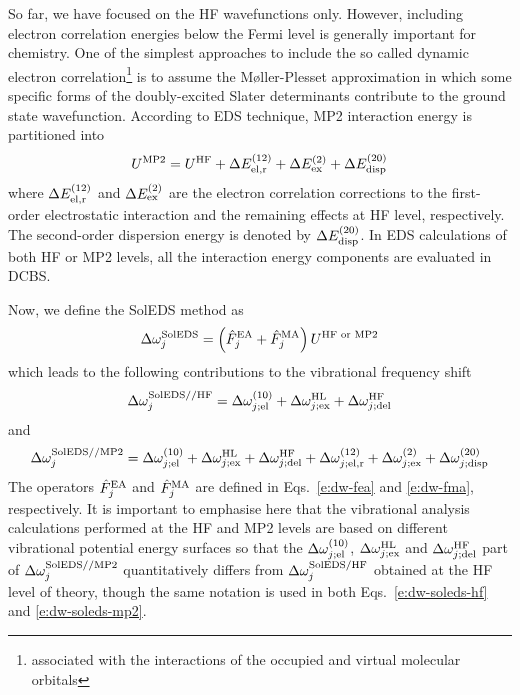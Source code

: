 \documentclass[a4paper,titlepage,twoside,fleqn,12pt]{book}
\begin{document}
\begin{refsection}
So far, we have focused on the HF wavefunctions only. \citep{Roothaan.RevModPhys.1951} 
However, including
electron correlation energies below the Fermi level is generally important
for chemistry. One of the simplest approaches to include the 
so called dynamic electron correlation\footnote{associated with
the interactions of the occupied and virtual molecular orbitals}
is to assume the 
M{\o}ller\hyp{}Plesset approximation \citep{Moller.Plesset.PhysRev.1934}
in which some specific forms of the doubly\hyp{}excited Slater
determinants contribute to the ground state wavefunction.
According to EDS technique, MP2 interaction energy is
partitioned into
%
\begin{equation}
 U^{\rm MP2} = U^{\rm HF}                    + 
               \Delta E_{\rm el,r}^{(12)}    + 
               \Delta E_{\rm ex}^{(2)}       +
               \Delta E_{\rm disp}^{(20)}  
\end{equation}
%
where $\Delta E_{\rm el,r}^{(12)}$ and $\Delta E_{\rm ex}^{(2)}$
are the electron correlation corrections to the first\hyp{}order
electrostatic interaction and the remaining effects at HF level,
respectively. The second\hyp{}order dispersion energy
is denoted by $\Delta E_{\rm disp}^{(20)}$. In EDS calculations
of both HF or MP2 levels,
all the interaction energy components are evaluated in DCBS.

Now, we define the SolEDS method as
%
\begin{equation} \label{e:dw-soleds}
 \Delta\omega_j^{\rm SolEDS} = \left(\hat{F}_j^{\rm EA} + \hat{F}_j^{\rm MA}\right)  U^{\rm HF\text{ or }MP2} 
\end{equation}
%
which leads to the following contributions to the vibrational
frequency shift
%
\begin{equation} \label{e:dw-soleds-hf}
 \Delta\omega_j^{\rm SolEDS//HF} = 
              \Delta \omega_{j;{\rm el}}^{(10)}    + 
              \Delta \omega_{j;{\rm ex}}^{\rm HL}  +
              \Delta \omega_{j;{\rm del}}^{\rm HF}
\end{equation}
%
and
%
\begin{equation} \label{e:dw-soleds-mp2}
 \Delta\omega_j^{\rm SolEDS//MP2} = 
              \Delta \omega_{j;{\rm el}}^{(10)}    + 
              \Delta \omega_{j;{\rm ex}}^{\rm HL}  +
              \Delta \omega_{j;{\rm del}}^{\rm HF} +
               \Delta \omega_{j;{\rm el,r}}^{(12)}    + 
               \Delta \omega_{j;{\rm ex}}^{(2)}       +
               \Delta \omega_{j;{\rm disp}}^{(20)}  
\end{equation}
%
The operators $\hat{F}_j^{\rm EA}$ and $\hat{F}_j^{\rm MA}$
are defined in Eqs.~\eqref{e:dw-fea} and \eqref{e:dw-fma}, respectively.
It is important to emphasise here that the vibrational analysis 
calculations performed at the HF and MP2 levels are based on different
vibrational potential energy surfaces so that the $\Delta \omega_{j;{\rm el}}^{(10)}$,
$\Delta \omega_{j;{\rm ex}}^{\rm HL}$ and $\Delta \omega_{j;{\rm del}}^{\rm HF}$ 
part of $\Delta\omega_j^{\rm SolEDS//MP2}$ quantitatively differs from
$\Delta\omega_j^{\rm SolEDS/HF}$ obtained at the HF level of theory,
though the same notation is used in both Eqs.~\eqref{e:dw-soleds-hf} 
and \eqref{e:dw-soleds-mp2}.


\end{refsection}
\end{document}
